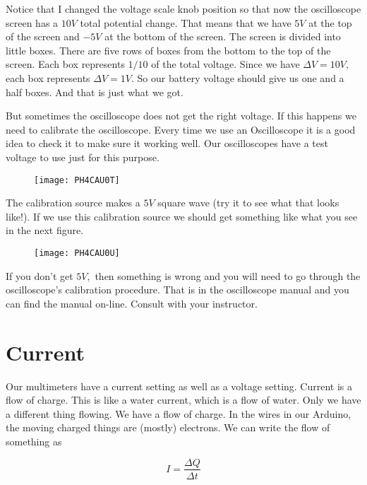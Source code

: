 Notice that I changed the voltage scale knob position so that now the oscilloscope screen has a $10\unit{V}$ total potential change. That means that we have $5\unit{V}$ at the top of the screen and $-5\unit{V}$ at the bottom of the screen. The screen is divided into little boxes. There are five rows of boxes from the bottom to the top of the screen. Each box represents $1/10$ of the total voltage. Since we have $\Delta V=10\unit{V},$ each box represents $\Delta V=1\unit{V}. $ So our battery voltage should give us one and a half boxes. And that is just what we got.

But sometimes the oscilloscope does not get the right voltage. If this happens we need to calibrate the oscilloscope. Every time we use an Oscilloscope it is a good idea to check it to make sure it working well. Our oscilloscopes have a test voltage to use just for this purpose.

\begin{figure}[h!]
    \centering
    \texttt{[image: PH4CAU0T]}
\end{figure}

The calibration source makes a $5\unit{V}$ square wave (try it to see what that looks like!). If we use this calibration source we should get something like what you see in the next figure. 

\begin{figure}[h!]
	\centering
    \texttt{[image: PH4CAU0U]}
\end{figure}

If you don't get $5\unit{V},$ then something is wrong and you will need to go through the oscilloscope's calibration procedure. That is in the oscilloscope manual and you can find
the manual on-line. Consult with your instructor.

\section{Current}

Our multimeters have a current setting as well as a voltage setting. Current is a flow of charge. This is like a water current, which is a flow of water. Only we have a different thing flowing. We have a flow of charge. In the wires in our Arduino, the moving charged things are (mostly) electrons. We can write the flow of something as 

\begin{equation*}
	I=\frac{\Delta Q}{\Delta t}
\end{equation*}

